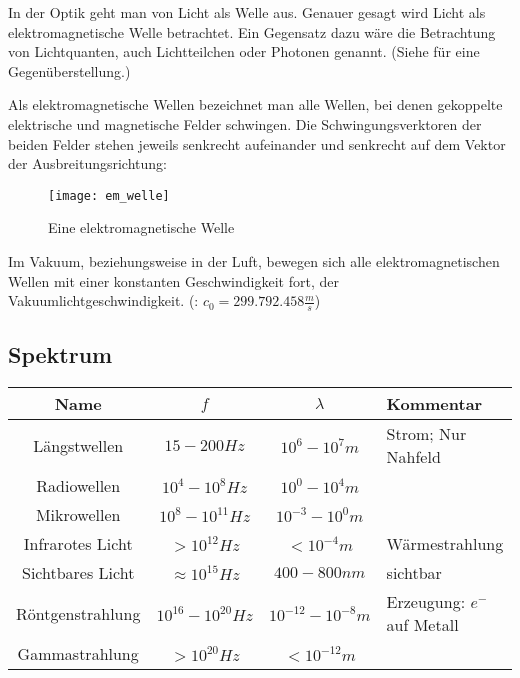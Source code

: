 In der Optik geht man von Licht als Welle aus. Genauer gesagt wird Licht als elektromagnetische Welle betrachtet. Ein Gegensatz dazu wäre die Betrachtung von Lichtquanten, auch Lichtteilchen oder Photonen genannt. (Siehe  für eine Gegenüberstellung.)

Als elektromagnetische Wellen bezeichnet man alle Wellen, bei denen gekoppelte elektrische und magnetische Felder schwingen. Die Schwingungsverktoren der beiden Felder stehen jeweils senkrecht aufeinander und senkrecht auf dem Vektor der Ausbreitungsrichtung:

\begin{figure}[h!]
	\center
	\texttt{[image: em\_welle]}
	\caption{Eine elektromagnetische Welle}
	\label{fig:emwelle}
\end{figure}

Im Vakuum, beziehungsweise in der Luft, bewegen sich alle elektromagnetischen Wellen mit einer konstanten Geschwindigkeit fort, der Vakuumlichtgeschwindigkeit. (: $c_0=299.792.458 \frac{m}{s}$)

\subsection{Spektrum}
\hspace*{-25pt}
\begin{tabular}[c]{|c|c|c|l|}
	\hline
	Name				&	$f$						& $\lambda$ 	& Kommentar\\
	\hline
	Längstwellen		&	$15-200Hz$				& $10^6-10^7m$ & Strom; Nur Nahfeld\\
	Radiowellen			&	$10^4-10^8Hz$			& $10^0-10^4m$ & \\
	Mikrowellen			&	$10^8-10^{11}Hz$		& $10^{-3}-10^{0}m$ & \\
	Infrarotes Licht	&	$>10^{12}Hz$			& $<10^{-4}m$ & \glqq Wärmestrahlung\grqq \\
	Sichtbares Licht	&	$\approx 10^{15}Hz$		& $400-800nm$ & sichtbar\\
	Röntgenstrahlung	&	$10^{16} - 10^{20}Hz$	& $10^{-12}-10^{-8}m$ & Erzeugung: $e^{-}$ auf Metall \\
	Gammastrahlung		&	$>10^{20}Hz$			& $<10^{-12}m$ & \\
	\hline
\end{tabular}